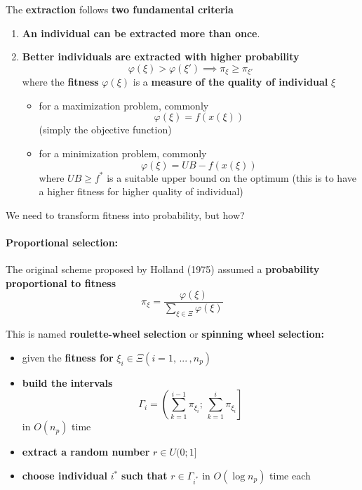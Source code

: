 The \textbf{extraction} follows \textbf{two fundamental criteria}
\begin{enumerate}
	\item \textbf{An individual can be extracted more than once}.\\
	
	\item \textbf{Better individuals are extracted with higher probability}
	$$ \varphi (\xi) > \varphi (\xi') \implies \pi_{\xi} \geq \pi_{\xi'} $$
	where the \textbf{fitness} $\varphi (\xi)$ is a \textbf{measure of the quality of individual} $\xi$
	\begin{itemize}
		\item for a maximization problem, commonly
		$$ \varphi (\xi) = f (x(\xi)) $$
		(simply the objective function)
		
		\item for a minimization problem, commonly
		$$ \varphi (\xi) = UB - f (x (\xi)) $$
		where $UB \geq f^\ast$ is a suitable upper bound on the optimum (this is to have a higher fitness for higher quality of individual)
	\end{itemize}
\end{enumerate}

We need to transform fitness into probability, but how? \\

\newpage

\paragraph{Proportional selection:} The original scheme proposed by Holland (1975) assumed a \textbf{probability proportional to fitness}
$$ \pi_{\xi} = \frac{\varphi (\xi)}{\sum_{\xi \in \Xi} \varphi (\xi)} $$

This is named \textbf{roulette-wheel selection} or \textbf{spinning wheel selection:}
\begin{itemize}
	\item given the \textbf{fitness for} $\xi_i \in \Xi (i = 1, \, ... \, , n_p )$
	
	\item \textbf{build the intervals} 
	$$ \Gamma_i = \left( \sum_{k=1}^{i-1} \pi_{\xi_i}; \, \sum_{k=1}^{i} \pi_{\xi_i} \right] $$
	in $O (n_p )$ time
	
	\item \textbf{extract a random number} $r \in U (0; 1]$
	
	\item \textbf{choose individual} $i^\ast$ \textbf{such that} $r \in \Gamma_{i^\ast}$ in $O (\log n_p )$ time each
\end{itemize}

